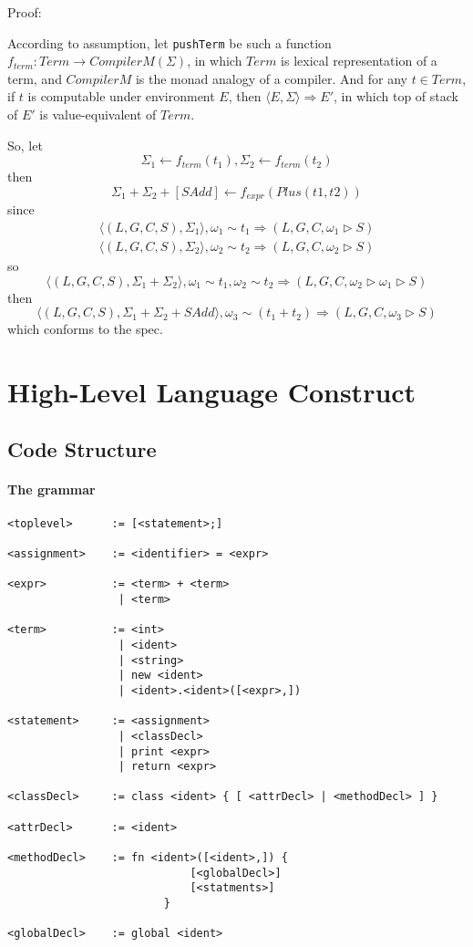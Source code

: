 \documentclass[]{article}
\numberwithin{equation}{section}
\numberwithin{figure}{section}
\numberwithin{table}{section}
\begin{document}
Proof:

According to assumption, let \texttt{pushTerm} be such a function
$f_{term}: Term \rightarrow CompilerM(\Sigma)$, in which $Term$ is lexical
representation of a term, and $CompilerM$ is the monad analogy of a
compiler. And for any $t \in Term$, if $t$ is computable under
environment $E$, then $\langle E, \Sigma \rangle \Rightarrow E'$, in which top of stack
of $E'$ is value-equivalent of $Term$.

So, let $$\Sigma_1 \leftarrow f_{term}(t_1), \Sigma_2 \leftarrow f_{term}(t_2)$$
then $$ \Sigma_1 + \Sigma_2 + [SAdd] \leftarrow f_{expr}(Plus(t1, t2))$$
since
\begin{gather*}
  \langle (L, G, C, S), \Sigma_1\rangle, \omega_1 \sim t_1 \Rightarrow (L, G, C, \omega_1 \rhd S) \\
  \langle (L, G, C, S), \Sigma_2\rangle, \omega_2 \sim t_2 \Rightarrow (L, G, C, \omega_2 \rhd S)
\end{gather*}
so $$\langle (L, G, C, S), \Sigma_1 + \Sigma_2\rangle, \omega_1 \sim t_1, \omega_2 \sim t_2 \Rightarrow (L, G, C, \omega_2 \rhd \omega_1 \rhd S)$$
then $$\langle (L, G, C, S), \Sigma_1 + \Sigma_2 + SAdd\rangle, \omega_3 \sim (t_1 + t_2) \Rightarrow (L, G, C, \omega_3 \rhd S)$$
which conforms to the spec.

\section{High-Level Language Construct}\label{high-level-language-construct}

\subsection{Code Structure}\label{code-structure}

\paragraph{The grammar}\label{the-grammar}

\begin{verbatim}
<toplevel>      := [<statement>;]

<assignment>    := <identifier> = <expr>

<expr>          := <term> + <term>
                 | <term>

<term>          := <int>
                 | <ident>
                 | <string>
                 | new <ident>
                 | <ident>.<ident>([<expr>,])

<statement>     := <assignment>
                 | <classDecl>
                 | print <expr>
                 | return <expr>

<classDecl>     := class <ident> { [ <attrDecl> | <methodDecl> ] }

<attrDecl>      := <ident>

<methodDecl>    := fn <ident>([<ident>,]) {
                            [<globalDecl>]
                            [<statments>]
                        }

<globalDecl>    := global <ident>
\end{verbatim}
\end{document}
